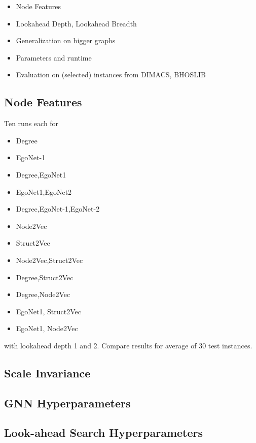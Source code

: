 \documentclass[draft,final]{vutinfth} %
\begin{document}
\begin{itemize}
    \item Node Features
    \item Lookahead Depth, Lookahead Breadth
    \item Generalization on bigger graphs
    \item Parameters and runtime
    \item Evaluation on (selected) instances from DIMACS, BHOSLIB 
\end{itemize}

\subsection{Node Features}


Ten runs each for
\begin{itemize}
    \item Degree
    \item EgoNet-1
    \item Degree,EgoNet1
    \item EgoNet1,EgoNet2
    \item Degree,EgoNet-1,EgoNet-2
    \item Node2Vec
    \item Struct2Vec
    \item Node2Vec,Struct2Vec
    \item Degree,Struct2Vec
    \item Degree,Node2Vec
    \item EgoNet1, Struct2Vec
    \item EgoNet1, Node2Vec
\end{itemize}
with lookahead depth 1 and 2. Compare results for average of 30 test instances. 

\subsection{Scale Invariance}

\subsection{GNN Hyperparameters}

\subsection{Look-ahead Search Hyperparameters}
\end{document}
